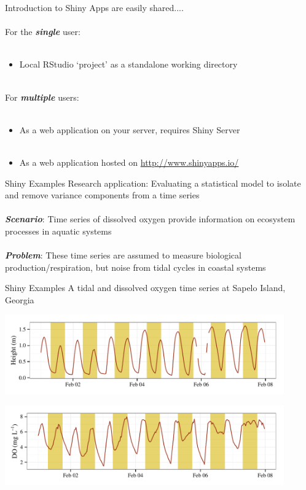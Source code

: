 \documentclass[serif]{beamer}\usepackage[]{graphicx}\usepackage[]{color}
\newcommand{\emtxt}[1]{\textbf{\textit{#1}}}
\begin{document}
\begin{frame}{Introduction to Shiny}
Apps are easily shared.... \\~\\
For the \emtxt{single} user: \\~\\
\begin{itemize}
\item Local RStudio `project' as a standalone working directory \\~\\
\end{itemize}
For \emtxt{multiple} users: \\~\\
\begin{itemize}
\item As a web application on your server, requires Shiny Server \\~\\
\item As a web application hosted on \url{http://www.shinyapps.io/}
\end{itemize}
\end{frame}

\begin{frame}{Shiny Examples}
Research application: Evaluating a statistical model to isolate and remove variance components from a time series\\~\\
\emtxt{Scenario}: Time series of dissolved oxygen provide information on ecosystem processes in aquatic systems \\~\\
\emtxt{Problem}: These time series are assumed to measure biological production/respiration, but noise from tidal cycles in coastal systems 
\end{frame}

\begin{frame}{Shiny Examples}
A tidal and dissolved oxygen time series at Sapelo Island, Georgia
\centerline{\includegraphics[width = 0.9\textwidth]{fig/saptide.pdf}}
\centerline{\includegraphics[width = 0.9\textwidth]{fig/sapdo.pdf}}
\end{frame}
\end{document}
